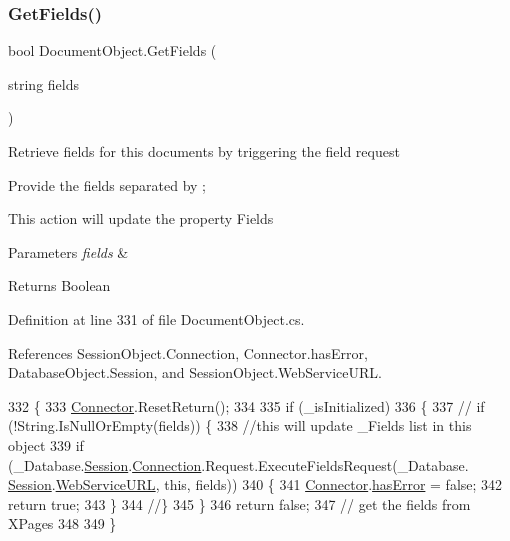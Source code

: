 \subsubsection{\texorpdfstring{Get\+Fields()}{GetFields()}\hspace{0.1cm}{\footnotesize\ttfamily [1/2]}}
{\footnotesize\ttfamily bool Document\+Object.\+Get\+Fields (\begin{DoxyParamCaption}\item[{string}]{fields }\end{DoxyParamCaption})}



Retrieve fields for this documents by triggering the field request 

Provide the fields separated by ;

This action will update the property \textquotesingle{}Fields\textquotesingle{}


\begin{DoxyParams}{Parameters}
{\em fields} & \\
\hline
\end{DoxyParams}
\begin{DoxyReturn}{Returns}
Boolean
\end{DoxyReturn}


Definition at line 331 of file Document\+Object.\+cs.



References Session\+Object.\+Connection, Connector.\+has\+Error, Database\+Object.\+Session, and Session\+Object.\+Web\+Service\+U\+RL.


\begin{DoxyCode}
332     \{
333         \mbox{\hyperlink{class_connector}{Connector}}.ResetReturn();
334 
335         \textcolor{keywordflow}{if} (\_isInitialized)
336         \{
337             \textcolor{comment}{// if (!String.IsNullOrEmpty(fields)) \{}
338             \textcolor{comment}{//this will update \_Fields list in this object}
339             \textcolor{keywordflow}{if} (\_Database.\mbox{\hyperlink{class_database_object_aa8484162b7d2a7c4c9426bca13c64c07}{Session}}.\mbox{\hyperlink{class_session_object_a014bdbf705a753540e19bfb53030c55c}{Connection}}.Request.ExecuteFieldsRequest(\_Database.
      \mbox{\hyperlink{class_database_object_aa8484162b7d2a7c4c9426bca13c64c07}{Session}}.\mbox{\hyperlink{class_session_object_a697c071c812fbf7ad1166b896fb44c16}{WebServiceURL}}, \textcolor{keyword}{this}, fields))
340             \{
341                 \mbox{\hyperlink{class_connector}{Connector}}.\mbox{\hyperlink{class_connector_a079bae21a5417efa53bfe8954c0f533f}{hasError}} = \textcolor{keyword}{false};
342                 \textcolor{keywordflow}{return} \textcolor{keyword}{true};
343             \}
344             \textcolor{comment}{//\}}
345         \}
346         \textcolor{keywordflow}{return} \textcolor{keyword}{false};
347         \textcolor{comment}{// get the fields from XPages}
348 
349     \}
\end{DoxyCode}
\mbox{\label{class_document_object_a8e38704e02850b2480d29d184ae2c0e0}} 
